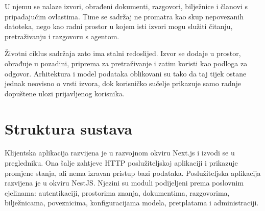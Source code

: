  U njemu se nalaze izvori, obrađeni dokumenti, razgovori, bilježnice i članovi s pripadajućim ovlastima. Time se sadržaj ne promatra kao skup nepovezanih datoteka, nego kao radni prostor u kojem isti izvori mogu služiti čitanju, pretraživanju i razgovoru s agentom.

Životni ciklus sadržaja zato ima stalni redoslijed. Izvor se dodaje u prostor, obrađuje u pozadini, priprema za pretraživanje i zatim koristi kao podloga za odgovor. Arhitektura i model podataka oblikovani su tako da taj tijek ostane jednak neovisno o vrsti izvora, dok korisničko sučelje prikazuje samo radnje dopuštene ulozi prijavljenog korisnika.

\section{Struktura sustava}

 Klijentska aplikacija razvijena je u razvojnom okviru Next.js i izvodi se u pregledniku. Ona šalje zahtjeve HTTP poslužiteljskoj aplikaciji i prikazuje promjene stanja, ali nema izravan pristup bazi podataka. Poslužiteljska aplikacija razvijena je u okviru NestJS. Njezini su moduli podijeljeni prema poslovnim cjelinama: autentikaciji, prostorima znanja, dokumentima, razgovorima, bilježnicama, poveznicima, konfiguracijama modela, pretplatama i administraciji.

